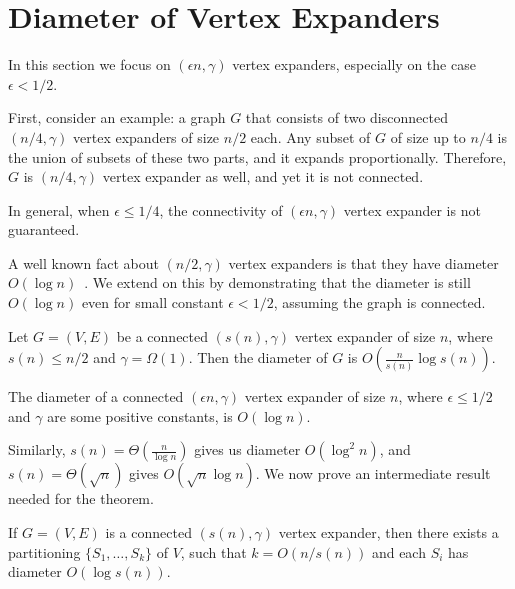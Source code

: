 \section{Diameter of Vertex Expanders}

In this section we focus on $(\epsilon n,\gamma)$ vertex expanders,
especially on the case $\epsilon<1/2$.

First, consider an example: a graph $G$ that consists of two disconnected
$(n/4,\gamma)$ vertex expanders of size $n/2$ each.
Any subset of $G$ of size up to $n/4$ is the union of subsets of these two parts,
and it expands proportionally.
Therefore, $G$ is $(n/4,\gamma)$ vertex expander as well,
and yet it is not connected.

In general, when $\epsilon\leq1/4$, the connectivity of
$(\epsilon n,\gamma)$ vertex expander is not guaranteed.

A well known fact about $(n/2,\gamma)$ vertex expanders is that
they have diameter $O(\log n)$~\cite{rao12,hlw06}.
We extend on this by demonstrating that the diameter is still $O(\log n)$
even for small constant $\epsilon<1/2$, assuming the graph is connected.

\begin{theorem}
    \label{thm:vertex-expander-diameter}
    Let $G=(V,E)$ be a connected $(s(n),\gamma)$ vertex expander of size $n$,
    where $s(n)\leq n/2$ and $\gamma=\Omega(1)$.
    Then the diameter of $G$ is $O\left(\frac{n}{s(n)}\log s(n)\right)$.
\end{theorem}

\begin{corollary}
    The diameter of a connected $(\epsilon n,\gamma)$ vertex expander of size $n$,
    where $\epsilon\leq1/2$ and $\gamma$ are some positive constants, is $O(\log n)$.
\end{corollary}

Similarly, $s(n)=\Theta\left(\frac{n}{\log n}\right)$ gives us
diameter $O\left(\log^2n\right)$,
and $s(n)=\Theta(\sqrt{n})$ gives $O\left(\sqrt{n}\log n\right)$.
We now prove an intermediate result needed for the theorem.

\begin{lemma}
    \label{lem:vertex-expander-partitioning}
    If $G=(V,E)$ is a connected $(s(n),\gamma)$ vertex expander,
    then there exists a partitioning $\{S_1,\ldots,S_k\}$ of $V$,
    such that $k=O(n/s(n))$ and each $S_i$ has diameter $O(\log s(n))$.
\end{lemma}

